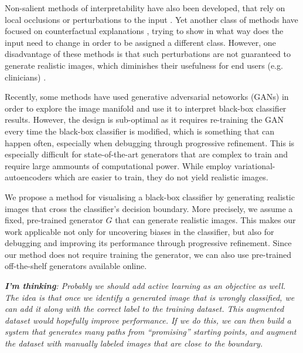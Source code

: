\documentclass{article}
\begin{document}
Non-salient methods of interpretability have also been developed, that rely on local occlusions or perturbations to the input \cite{zhou2014object,fong2017interpretable}. Yet another class of methods have focused on counterfactual explanations \cite{wachter2017counterfactual,goyal2019counterfactual,mothilal2019explaining}, trying to show in what way does the input need to change in order to be assigned a different class. However, one disadvantage of these methods is that such perturbations are not guaranteed to generate realistic images, which diminishes their usefulness for end users (e.g. clinicians) \cite{singla2019explanation}.

Recently, some methods \cite{singla2019explanation,samangouei2018explaingan,liu2019generative} have used generative adversarial netoworks (GANs) in order to explore the image manifold and use it to interpret black-box classifier results. However, the design is sub-optimal as it requires re-training the GAN every time the black-box classifier is modified, which is something that can happen often, especially when debugging through progressive refinement. This is especially difficult for state-of-the-art \cite{karras2019style,brock2018large} generators that are complex to train and require large ammounts of computational power. While \cite{joshi2018xgems} employ variational-autoencoders which are easier to train, they do not yield realistic images.

We propose a method for visualising a black-box classifier by generating realistic images that cross the classifier's decision boundary. More precisely, we assume a fixed, pre-trained generator $G$ that can generate realistic images. This makes our work applicable not only for uncovering biases in the classifier, but also for debugging and improving its performance through progressive refinement. Since our method does not require training the generator, we can also use pre-trained off-the-shelf generators available online. 

\emph{\textbf{I'm thinking}: Probably we should add active learning as an objective as well. The idea is that once we identify a generated image that is wrongly classified, we can add it along with the correct label to the training dataset. This augmented dataset would hopefully improve performance. If we do this, we can then build a system that generates many paths from ``promising'' starting points, and augment the dataset with manually labeled images that are close to the boundary.}


\newcommand{\bz}{\textbf{z}}
\end{document}
